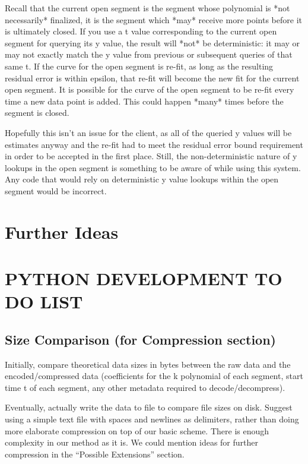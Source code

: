 \documentclass{article}
\begin{document}
Recall that the current open segment is the segment whose polynomial is *not necessarily* finalized, it is the segment which *may* receive more points before it is ultimately closed. If you use a t value corresponding to the current open segment for querying its y value, the result will *not* be deterministic: it may or may not exactly match the y value from previous or subsequent queries of that same t.
If the curve for the open segment is re-fit, as long as the resulting residual error is within epsilon, that re-fit will become the new fit for the current open segment. It is possible for the curve of the open segment to be re-fit every time a new data point is added. This could happen *many* times before the segment is closed.

Hopefully this isn’t an issue for the client, as all of the queried y values will be estimates anyway and the re-fit had to meet the residual error bound requirement in order to be accepted in the first place. Still, the non-deterministic nature of y lookups in the open segment is something to be aware of while using this system. Any code that would rely on deterministic y value lookups within the open segment would be incorrect.


\section{Further Ideas}


\section{PYTHON DEVELOPMENT TO DO LIST}

\subsection{Size Comparison (for Compression section)}
Initially, compare theoretical data sizes in bytes between the raw data and the encoded/compressed data (coefficients for the k polynomial of each segment, start time t of each segment, any other metadata required to decode/decompress).

Eventually, actually write the data to file to compare file sizes on disk. Suggest using a simple text file with spaces and newlines as delimiters, rather than doing more elaborate compression on top of our basic scheme. There is enough complexity in our method as it is.
We could mention ideas for further compression in the “Possible Extensions” section.
\end{document}
